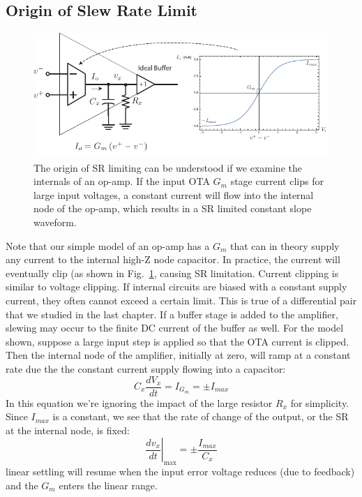 \subsection{Origin of Slew Rate Limit}
\begin{figure}[tb]
\centering
\includegraphics[width=\columnwidth]{opamp_ota_SR}
\caption{The origin of SR limiting can be understood if we examine the internals of an op-amp. If the input OTA $G_m$ stage current clips for large input voltages, a constant current will flow into the internal node of the op-amp, which results in a SR limited constant slope waveform.}
\label{fig:opamp_ota_SR}
\end{figure}

Note that our simple model of an op-amp has a $G_m$ that can in theory supply any current to the internal high-Z node capacitor. In practice, the current will eventually clip (as shown in Fig.~\ref{fig:opamp_ota_SR}, causing SR limitation.  Current clipping is similar to voltage clipping. If internal circuits are biased with a constant supply current, they often cannot exceed a certain limit.  This is true of a differential pair that we studied in the last chapter.  If a buffer stage is added to the amplifier, slewing may occur to the finite DC current of the buffer as well.  For the model shown, suppose a large input step is applied so that the OTA current is clipped.  Then the internal node of the amplifier, initially at zero, will ramp at a constant rate due the the constant current supply flowing into a capacitor:
    \begin{equation}
        C_x \frac{dV_x}{dt} = I_{G_m} = \pm I_{max} 
    \end{equation}
In this equation we're ignoring the impact of the large resistor $R_x$ for simplicity.  Since $I_{max}$ is a constant, we see that the rate of change of the output, or the SR at the internal node, is fixed:
    \begin{equation}
        \left.	\frac{dv_x}{dt} \right|_{\text{max}} = \pm \frac{I_{max}}{C_x} 
    \end{equation}
linear settling will resume when the input error voltage reduces (due to feedback) and the $G_m$ enters the linear range.
